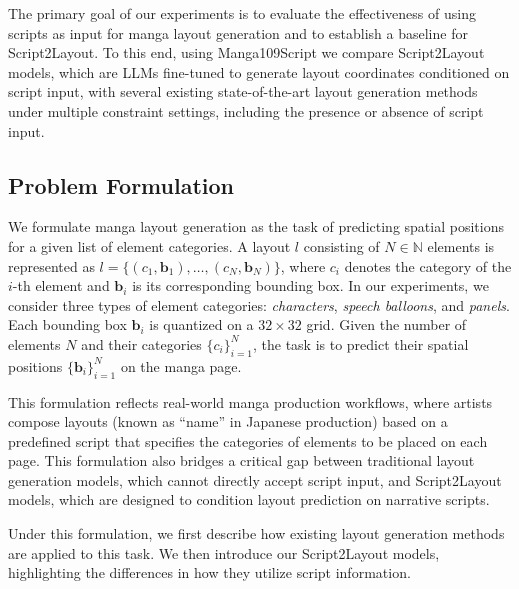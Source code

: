 \documentclass[sigconf, screen, review, anonymous]{acmart}
\begin{document}
The primary goal of our experiments is to evaluate the effectiveness of using scripts as input for manga layout generation and to establish a baseline for Script2Layout. To this end, using Manga109Script we compare Script2Layout models, which are LLMs fine-tuned to generate layout coordinates conditioned on script input, with several existing state-of-the-art layout generation methods~\cite{inoue2023layoutdm, jiang_layoutformer_2023, lin_layoutprompter_2023} under multiple constraint settings, including the presence or absence of script input. 

\subsection{Problem Formulation}
We formulate manga layout generation as the task of predicting spatial positions for a given list of element categories. A layout $l$ consisting of $N \in \mathbb{N}$ elements is represented as $l = \{(c_1, \mathbf{b}_1), \dots, (c_N, \mathbf{b}_N)\}$, where $c_i$ denotes the category of the $i$-th element and $\mathbf{b}_i$ is its corresponding bounding box. In our experiments, we consider three types of element categories: \textit{characters}, \textit{speech balloons}, and \textit{panels}. Each bounding box $\mathbf{b}_i$ is quantized on a $32 \times 32$ grid. Given the number of elements $N$ and their categories $\{c_i\}_{i=1}^N$, the task is to predict their spatial positions $\{\mathbf{b}_i\}_{i=1}^N$ on the manga page.

This formulation reflects real-world manga production workflows, where artists compose layouts (known as “name” in Japanese production) based on a predefined script that specifies the categories of elements to be placed on each page. This formulation also bridges a critical gap between traditional layout generation models, which cannot directly accept script input, and Script2Layout models, which are designed to condition layout prediction on narrative scripts.


Under this formulation, we first describe how existing layout generation methods are applied to this task. We then introduce our Script2Layout models, highlighting the differences in how they utilize script information.
\end{document}
